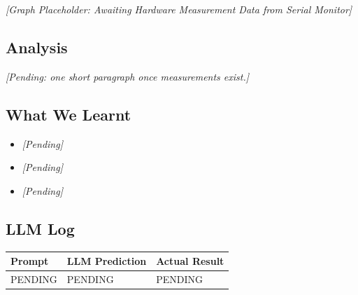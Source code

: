 \textit{[Graph Placeholder: Awaiting Hardware Measurement Data from Serial Monitor]}

\subsection{Analysis}
\textit{[Pending: one short paragraph once measurements exist.]}

\subsection{What We Learnt}
\begin{itemize}[noitemsep]
    \item \textit{[Pending]}
    \item \textit{[Pending]}
    \item \textit{[Pending]}
\end{itemize}

\subsection{LLM Log}
\begin{llmbox}
\begin{tabularx}{\textwidth}{p{2.7cm} X X}
\toprule
\textbf{Prompt} & \textbf{LLM Prediction} & \textbf{Actual Result} \\
\midrule
PENDING & PENDING & PENDING \\
\bottomrule
\end{tabularx}
\end{llmbox}
